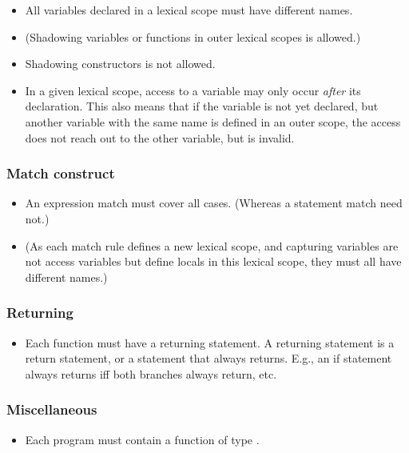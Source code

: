 \documentclass[english,10pt]{article} %
\theoremstyle{definitionstyle}
\theoremstyle{lemmastyle}
\begin{document}
\begin{itemize}
\item All variables declared in a lexical scope must have different names.
\item (Shadowing variables or functions in outer lexical scopes is allowed.)
\item Shadowing constructors is not allowed.
\item In a given lexical scope, access to a variable may only occur \emph{after} its declaration. This also means that if the variable is not yet declared, but another variable with the same name is defined in an outer scope, the access does not reach out to the other variable, but is invalid.
\end{itemize}


\subsubsection*{Match construct}

\begin{itemize}
\item An expression match must cover all cases. (Whereas a statement match need not.)
\item (As each match rule defines a new lexical scope, and capturing variables are not access variables but define locals in this lexical scope, they must all have different names.)
\end{itemize}


\subsubsection*{Returning}

\begin{itemize}
\item Each function must have a returning statement. A returning statement is a return statement, or a statement that always returns. E.g., an if statement always returns iff both branches always return, etc.
\end{itemize}


\subsubsection*{Miscellaneous}

\begin{itemize}
\item Each program must contain a function  of type .
\end{itemize}
\end{document}
